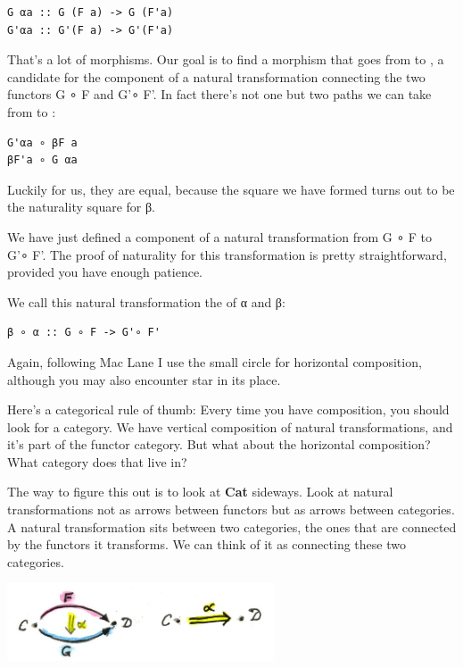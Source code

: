 \begin{verbatim}
G αa :: G (F a) -> G (F'a)
G'αa :: G'(F a) -> G'(F'a)
\end{verbatim}

That's a lot of morphisms. Our goal is to find a morphism that goes from
 to , a candidate for the
component of a natural transformation connecting the two functors G ∘ F
and G'∘ F'. In fact there's not one but two paths we can take from
 to :

\begin{verbatim}
G'αa ∘ βF a
βF'a ∘ G αa
\end{verbatim}

Luckily for us, they are equal, because the square we have formed turns
out to be the naturality square for β.

We have just defined a component of a natural transformation from G ∘ F
to G'∘ F'. The proof of naturality for this transformation is pretty
straightforward, provided you have enough patience.

We call this natural transformation the  of
α and β:

\begin{verbatim}
β ∘ α :: G ∘ F -> G'∘ F'
\end{verbatim}

Again, following Mac Lane I use the small circle for horizontal
composition, although you may also encounter star in its place.

Here's a categorical rule of thumb: Every time you have composition, you
should look for a category. We have vertical composition of natural
transformations, and it's part of the functor category. But what about
the horizontal composition? What category does that live in?

The way to figure this out is to look at \textbf{Cat} sideways. Look at
natural transformations not as arrows between functors but as arrows
between categories. A natural transformation sits between two
categories, the ones that are connected by the functors it transforms.
We can think of it as connecting these two categories.

\includegraphics[width=3.12500in]{images/sideways.jpg}

